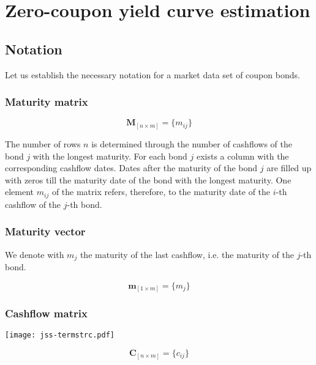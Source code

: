 \section{Zero-coupon yield curve estimation}

\subsection{Notation}
\label{sec:notation}

Let us establish the necessary notation for a market data set of coupon bonds.

\subsubsection*{Maturity matrix}

\begin{equation}\label{maturitym}
\bm{M}_{\left[n\times m\right]}= \{m_{ij}\}
\end{equation}

The number of rows $n$ is determined through the number of cashflows of the bond $j$ with the longest maturity. For each bond $j$ exists a column with the corresponding cashflow dates. Dates after the maturity of the bond $j$ are filled up with zeros till the maturity date of the bond with the longest maturity. One element $m_{ij}$ of the matrix  refers, therefore, to the maturity date of  the $i$-th cashflow of the $j$-th bond. 

\subsubsection*{Maturity vector}

We denote with $m_j$ the maturity of the last cashflow, i.e. the maturity of the $j$-th bond.

\begin{equation}\label{weights}
    \bm{m}_{\left[1\times m\right]}= \{m_j\}
\end{equation}

\subsubsection*{Cashflow matrix}
\texttt{[image: jss-termstrc.pdf]}

 \begin{equation}\label{cashflowm}
\bm{C}_{\left[n\times m\right]}= \{c_{ij}\}
\end{equation}

